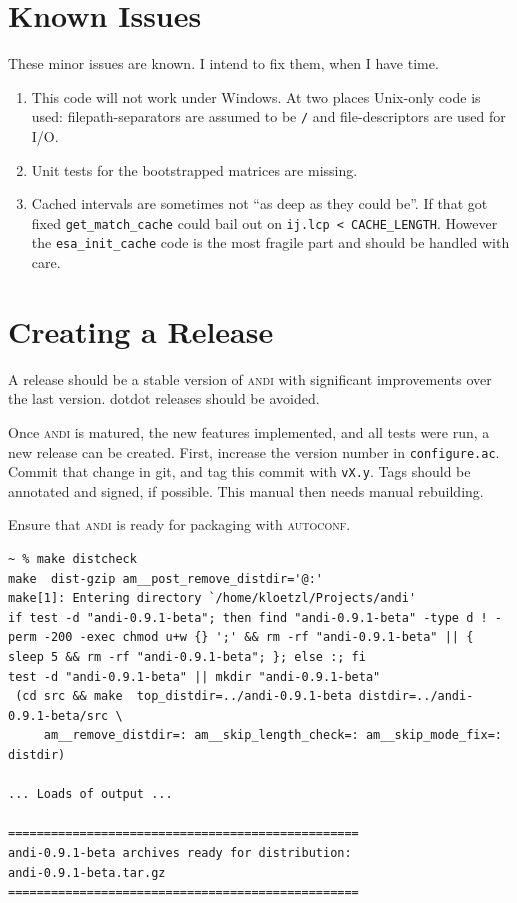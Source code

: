 \documentclass[a4paper,
  10pt,
  english,
  DIV=12,
  BCOR=8mm]{scrbook}
\newcommand{\algo}[1]{\textsc{{#1}}}
\newcommand{\andi}{\algo{andi}\xspace}
\begin{document}
\section{Known Issues}

These minor issues are known. I intend to fix them, when I have time.

\begin{enumerate}
  \item This code will not work under Windows. At two places Unix-only code is used: filepath-separators are assumed to be \lstinline$/$ and file-descriptors are used for I/O.
  \item Unit tests for the bootstrapped matrices are missing.
  \item Cached intervals are sometimes not “as deep as they could be”. If that got fixed \lstinline$get_match_cache$ could bail out on \lstinline$ij.lcp < CACHE_LENGTH$. However the \lstinline$esa_init_cache$ code is the most fragile part and should be handled with care.
\end{enumerate}


\section{Creating a Release}

A release should be a stable version of \andi with significant improvements over the last version. dotdot releases should be avoided.


Once \andi is matured, the new features implemented, and all tests were run, a new release can be created. First, increase the version number in \lstinline$configure.ac$. Commit that change in git, and tag this commit with \lstinline$vX.y$. Tags should be annotated and signed, if possible. This manual then needs manual rebuilding.

Ensure that \andi is ready for packaging with \algo{autoconf}.

\begin{lstlisting}
~ % make distcheck
make  dist-gzip am__post_remove_distdir='@:'
make[1]: Entering directory `/home/kloetzl/Projects/andi'
if test -d "andi-0.9.1-beta"; then find "andi-0.9.1-beta" -type d ! -perm -200 -exec chmod u+w {} ';' && rm -rf "andi-0.9.1-beta" || { sleep 5 && rm -rf "andi-0.9.1-beta"; }; else :; fi
test -d "andi-0.9.1-beta" || mkdir "andi-0.9.1-beta"
 (cd src && make  top_distdir=../andi-0.9.1-beta distdir=../andi-0.9.1-beta/src \
     am__remove_distdir=: am__skip_length_check=: am__skip_mode_fix=: distdir)

... Loads of output ...

=================================================
andi-0.9.1-beta archives ready for distribution: 
andi-0.9.1-beta.tar.gz
=================================================
\end{lstlisting}
\end{document}

